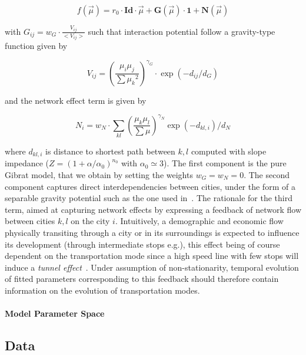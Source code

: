 \documentclass[Royal,sageh,times]{sagej}
\begin{document}
\begin{equation}
f(\vec{\mu}) = r_0\cdot \mathbf{Id}\cdot \vec{\mu} + \mathbf{G}\left(\vec{\mu}\right)\cdot \mathbf{1} + \mathbf{N}\left(\vec{\mu}\right)
\end{equation}

with $G_{ij} = w_G\cdot \frac{V_{ij}}{<V_{ij}>}$ such that interaction potential follow a gravity-type function given by 

\begin{equation}
V_{ij} = \left(\frac{\mu_i\mu_j}{\sum{\mu_k}^2}\right)^{\gamma_G}\cdot \exp{(-d_{ij}/d_G)}
\end{equation}

and the network effect term is given by


\begin{equation}
N_{i} = w_N \cdot \sum_{kl} \left(\frac{\mu_k\mu_l}{\sum\mu}\right)^{\gamma_N}\exp{(-d_{kl,i})/d_N}
\end{equation}

where $d_{kl,i}$ is distance to shortest path between $k,l$ computed with slope impedance ($Z=\left(1+\alpha/\alpha_0\right)^{n_0}$ with $\alpha_0\simeq 3$). The first component is the pure Gibrat model, that we obtain by setting the weights $w_G = w_N = 0$. The second component captures direct interdependencies between cities, under the form of a separable gravity potential such as the one used in~\cite{sanders1992systeme}. The rationale for the third term, aimed at capturing network effects by expressing a feedback of network flow between cities $k,l$ on the city $i$. Intuitively, a demographic and economic flow physically transiting through a city or in its surroundings is expected to influence its development (through intermediate stops e.g.), this effect being of course dependent on the transportation mode since a high speed line with few stops will induce a \emph{tunnel effect}~\cite{}.%
 Under assumption of non-stationarity, temporal evolution of fitted parameters corresponding to this feedback should therefore contain information on the evolution of transportation modes.


\paragraph{Model Parameter Space}






\subsection*{Data}
\end{document}
